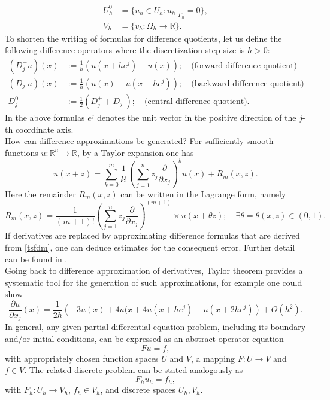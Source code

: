 \documentclass[%
    corpo=11pt,
    twoside,
    stile=classica,
    oldstyle,
    autoretitolo,
    tipotesi=magistrale,
    greek,
    evenboxes,
    english
]{toptesi}
\begin{document}
\begin{appendices}
\begin{align}
U_h^0 &= \{u_h \in U_h : u_h|_{\Gamma_h} = 0 \}, \\
V_h &= \{v_h: \Omega_h \longrightarrow \mathbb{R} \}.
\end{align}
To shorten the writing of formulas for difference quotients, let us define the following difference operators where the discretization step size is $h > 0$:
\begin{align}
(D_j^+u)(x)&:= \frac{1}{h}\left(u(x +he^j) - u(x) \right); \quad \text{(forward difference quotient)} \nonumber \\
(D_j^-u)(x)&:= \frac{1}{h}\left(u(x) - u(x -he^j) \right); \quad \text{(backward difference quotient)} \nonumber \\
D_j^0 &:= \frac{1}{2}\left(D_j^+ + D_j^- \right); \quad \text{(central difference quotient).} \nonumber
\end{align}
In the above formulas $e^j$ denotes the unit vector in the positive direction of the $j$-th coordinate axis. \\
How can difference approximations be generated? For sufficiently smooth functions $u:\mathbb{R}^n \longrightarrow \mathbb{R}$, by a Taylor expansion one has
\begin{equation}
\label{tsfdm}
u(x + z) = \sum_{k=0}^{m}\frac{1}{k!}\left(\sum_{j=1}^n z_j \frac{\partial}{\partial x_j} \right)^ku(x) + R_m(x,z).
\end{equation}
Here the remainder $R_m(x,z)$ can be written in the Lagrange form, namely
\begin{equation}
R_m(x,z) = \frac{1}{(m+1)!}\left(\sum_{j=1}^n z_j \frac{\partial}{\partial x_j} \right)^{(m+1)} \times u(x + \theta z); \quad \exists \theta = \theta (x,z) \in (0,1).
\end{equation}
If derivatives are replaced by approximating difference formulas that are derived from \eqref{tsfdm}, one can deduce estimates for the consequent error. Further detail can be found in \cite{fdm}. \\
Going back to difference approximation of derivatives, Taylor theorem provides a systematic tool for the generation of such approximations, for example one could show
\begin{equation}
\frac{\partial u}{\partial x_j}(x) = \frac{1}{2h}\left(-3u(x) +4u(x +4u(x +he^j) - u(x +2he^j) \right) + O(h^2).
\end{equation}
In general, any given partial differential equation problem, including its boundary and/or initial conditions, can be expressed as an abstract operator equation
\begin{equation}
Fu = f,
\end{equation}
with appropriately chosen function spaces $U$ and $V$, a mapping $F: U \longrightarrow V$ and $f \in V$. The related discrete problem can be stated analogously as 
\begin{equation}
F_h u_h = f_h,
\end{equation}
with $F_h: U_h \longrightarrow V_h$, $f_h \in V_h$, and discrete spaces $U_h, V_h$.
\end{appendices}
\end{document}
